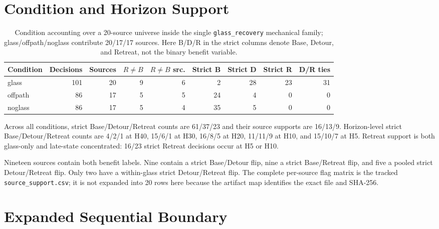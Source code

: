 \section{Condition and Horizon Support}
\label{app:support}

\begin{table}[H]
\centering
\small
\begin{tabular}{@{}lrrrrrrrr@{}}
\toprule
Condition & Decisions & Sources & $R\ne B$ & $R\ne B$ src. & Strict B & Strict D & Strict R & D/R ties \\
\midrule
glass & 101 & 20 & 9 & 6 & 2 & 28 & 23 & 31 \\
offpath & 86 & 17 & 5 & 5 & 24 & 4 & 0 & 0 \\
noglass & 86 & 17 & 5 & 4 & 35 & 5 & 0 & 0 \\
\bottomrule
\end{tabular}
\caption{Condition accounting over a 20-source universe inside the single
\texttt{glass\_recovery} mechanical family; glass/offpath/noglass contribute
20/17/17 sources. Here B/D/R in the strict columns denote Base, Detour, and
Retreat, not the binary benefit variable.}
\label{tab:condition-support}
\end{table}

Across all conditions, strict Base/Detour/Retreat counts are 61/37/23 and their
source supports are 16/13/9. Horizon-level strict Base/Detour/Retreat counts are
4/2/1 at H40, 15/6/1 at H30, 16/8/5 at H20, 11/11/9 at H10, and 15/10/7 at H5.
Retreat support is both glass-only and late-state concentrated: 16/23 strict
Retreat decisions occur at H5 or H10.

Nineteen sources contain both benefit labels. Nine contain a strict Base/Detour
flip, nine a strict Base/Retreat flip, and five a pooled strict Detour/Retreat
flip. Only two have a within-glass strict Detour/Retreat flip. The complete
per-source flag matrix is the tracked \texttt{source\_support.csv}; it is not
expanded into 20 rows here because the artifact map identifies the exact file
and SHA-256.

\section{Expanded Sequential Boundary}
\label{app:sequential}

